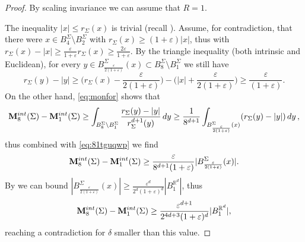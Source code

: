 \documentclass[10pt,a4paper]{amsart}
\newcommand{\R}{\mathbb{R}}
\newcommand{\eps}{\varepsilon}
\begin{document}
\begin{proof}
By scaling invariance we can assume that $R=1$.

    The inequality $|x|\leq r_\Sigma(x)$ is trivial (recall ). Assume, for contradiction, that there were $x\in B_{4}^\Sigma\setminus B_{2}^\Sigma$ with $r_\Sigma(x)\geq (1+\eps)|x|$, thus with $r_\Sigma(x)-|x|\geq \frac{\eps}{1+\eps}r_\Sigma(x)\geq \frac{2\eps}{1+\eps}$. By the triangle inequality (both intrinsic and Euclidean), for every $y\in B_{\frac{\eps}{2(1+\eps)}}^\Sigma(x)\subset B_8^\Sigma\setminus B_1^\Sigma$ we still have
    \begin{equation}\label{eq:81tguqwp}
        r_\Sigma(y)-|y|\geq \big(r_\Sigma(x)-\frac{\eps}{2(1+\eps)}\big)-\big(|x|+\frac{\eps}{2(1+\eps)}\big)\geq \frac{\eps}{(1+\eps)}.
    \end{equation}
    On the other hand, \eqref{eq:monfor} shows that
    $$
    {\bf M}_8^{\rm int}(\Sigma)-{\bf M}_1^{\rm int}(\Sigma)\geq \int_{B_8^\Sigma\setminus B_1^\Sigma} \frac{r_\Sigma(y)-|y|}{r_\Sigma^{d+1}(y)}\,dy\geq \frac{1}{8^{d+1}}\int_{B_{\frac{\eps}{2(1+\eps)}}^\Sigma(x)} (r_\Sigma(y)-|y|)\,dy\,,
    $$
    thus combined with \eqref{eq:81tguqwp} we find
    $$
    {\bf M}_8^{\rm int}(\Sigma)-{\bf M}_1^{\rm int}(\Sigma) \geq \frac{\eps}{8^{d+1}(1+\eps)}|B_{\frac{\eps}{2(1+\eps)}}^\Sigma(x)|.
    $$
    By  we can bound $|B_{\frac{\eps}{2(1+\eps)}}^\Sigma(x)|\geq \frac{\eps^d}{2^d(1+\eps)^d}|B_1^{\R^d}|$, thus
    $$
    {\bf M}_8^{\rm int}(\Sigma)-{\bf M}_1^{\rm int}(\Sigma) \geq \frac{\eps^{d+1}}{2^{4d+3}(1+\eps)^d}|B_1^{\R^d}|,
    $$
    reaching a contradiction for $\delta$ smaller than this value.
\end{proof}
\end{document}
